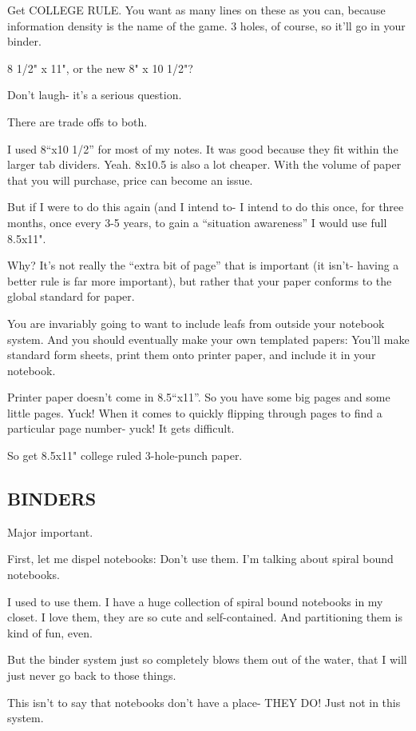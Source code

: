 \documentclass[oneside]{book}
\begin{document}
Get COLLEGE RULE. You want as many lines on these as you can, because
information density is the name of the game. 3 holes, of course, so
it'll go in your binder.

8 1/2" x 11", or the new 8" x 10 1/2"?

Don't laugh- it's a serious question.

There are trade offs to both.

I used 8``x10 1/2'' for most of my notes. It was good because they fit
within the larger tab dividers. Yeah. 8x10.5 is also a lot
cheaper. With the volume of paper that you will purchase, price can
become an issue.

But if I were to do this again (and I intend to- I intend to do this
once, for three months, once every 3-5 years, to gain a ``situation
awareness'' I would use full 8.5x11".

Why? It's not really the ``extra bit of page'' that is important (it
isn't- having a better rule is far more important), but rather that
your paper conforms to the global standard for paper.

You are invariably going to want to include leafs from outside your
notebook system. And you should eventually make your own templated
papers: You'll make standard form sheets, print them onto printer
paper, and include it in your notebook.

Printer paper doesn't come in 8.5``x11''. So you have some big pages and
some little pages. Yuck! When it comes to quickly flipping through
pages to find a particular page number- yuck! It gets difficult.

So get 8.5x11" college ruled 3-hole-punch paper.

\subsection*{BINDERS}

Major important.

First, let me dispel notebooks:
Don't use them. I'm talking about spiral bound notebooks.

I used to use them. I have a huge collection of spiral bound notebooks
in my closet. I love them, they are so cute and self-contained. And
partitioning them is kind of fun, even.

But the binder system just so completely blows them out of the water,
that I will just never go back to those things.

This isn't to say that notebooks don't have a place- THEY DO! Just not
in this system.
\end{document}
